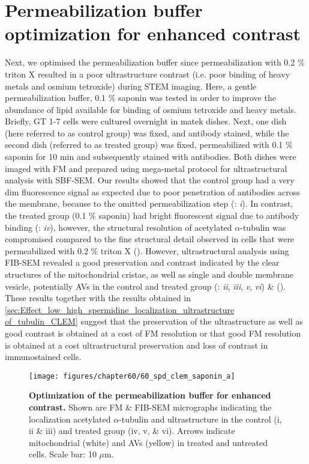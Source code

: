 \section{Permeabilization buffer optimization for enhanced contrast}
Next, we optimised the permeabilization buffer since permeabilization with 0.2 \% triton X resulted in a poor ultrastructure contrast (i.e. poor binding of heavy metals and osmium tetroxide) during STEM imaging. Here, a gentle permeabilization buffer, 0.1 \% saponin was tested in order to improve the abundance of lipid available for binding of osmium tetroxide and heavy metals. Briefly, GT 1-7 cells were cultured overnight in matek dishes. Next, one dish (here referred to as control group) was fixed, and antibody stained, while the second dish (referred to as  treated group) was fixed, permeabilized with 0.1 \% saponin for 10 min and subsequently stained with antibodies. Both dishes were imaged with FM and prepared using mega-metal protocol for ultrastructural analysis with SBF-SEM. Our results showed that the control group had a very dim fluorescence signal as expected due to poor penetration of antibodies across the membrane, because to the omitted permeabilization step (: \textit{i}). In contrast, the treated group (0.1 \% saponin) had bright fluorescent signal due to antibody binding (: \textit{iv}), however, the structural resolution of acetylated $\alpha$-tubulin was compromised compared to the fine structural detail observed in cells that were permeabilized with 0.2 \% triton X (). However, ultrastructural analysis using FIB-SEM revealed a good preservation and contrast  indicated by the clear structures of the mitochondrial cristae, as well as single and double membrane vesicle, potentially AVs  in the control and treated group (: \textit{ii}, \textit{iii}, \textit{v}, \textit{vi}) \& (). These results together with the results obtained in \cref{sec:Effect_low_high_spermidine_localization_ultrastructure of_tubulin_CLEM} suggest that the preservation of the ultrastructure as well as good contrast is obtained at a cost of FM resolution or that good FM resolution is obtained at a cost ultrastructural preservation and loss of contrast in immunostained cells.

\begin{landscape}
\begin{figure}[!htbp]
\center
  \texttt{[image: figures/chapter60/60\_spd\_clem\_saponin\_a]}
  \caption[Optimization of the permeabilization buffer for enhanced contrast]{\textbf{Optimization of the permeabilization buffer for enhanced contrast.} Shown are FM \& FIB-SEM micrographs indicating the localization acetylated $\alpha$-tubulin and ultrastructure in the control (i, ii \& iii) and treated group (iv, v, \& vi). Arrows indicate mitochondrial (white) and AVs (yellow) in treated and untreated cells. Scale bar: 10 $\mu$m.}
  \label{fig:60_spd_clem_saponin_a}
\end{figure} 
\end{landscape}

